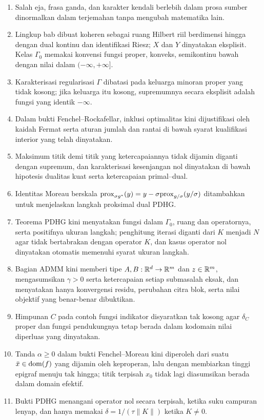 \documentclass[indonesian]{shinybook}
\begin{document}
\begin{enumerate}
    \item Salah eja, frasa ganda, dan karakter kendali berlebih dalam prosa sumber dinormalkan dalam terjemahan tanpa mengubah matematika lain.
    \item Lingkup bab dibuat koheren sebagai ruang Hilbert riil berdimensi hingga dengan dual kontinu dan identifikasi Riesz; $X$ dan $Y$ dinyatakan eksplisit. Kelas $\Gamma_0$ memakai konvensi fungsi proper, konveks, semikontinu bawah dengan nilai dalam $(-\infty,+\infty]$.
    \item Karakterisasi regularisasi $\Gamma$ dibatasi pada keluarga minoran proper yang tidak kosong; jika keluarga itu kosong, supremumnya secara eksplisit adalah fungsi yang identik $-\infty$.
    \item Dalam bukti Fenchel--Rockafellar, inklusi optimalitas kini dijustifikasi oleh kaidah Fermat serta aturan jumlah dan rantai di bawah syarat kualifikasi interior yang telah dinyatakan.
    \item Maksimum titik demi titik yang ketercapaiannya tidak dijamin diganti dengan supremum, dan karakterisasi kesenjangan nol dinyatakan di bawah hipotesis dualitas kuat serta ketercapaian primal--dual.
    \item Identitas Moreau berskala $\mathrm{prox}_{\sigma g^*}(y)=y-\sigma\mathrm{prox}_{g/\sigma}(y/\sigma)$ ditambahkan untuk menjelaskan langkah proksimal dual PDHG.
    \item Teorema PDHG kini menyatakan fungsi dalam $\Gamma_0$, ruang dan operatornya, serta positifnya ukuran langkah; penghitung iterasi diganti dari $K$ menjadi $N$ agar tidak bertabrakan dengan operator $K$, dan kasus operator nol dinyatakan otomatis memenuhi syarat ukuran langkah.
    \item Bagian ADMM kini memberi tipe $A,B:\mathbb{R}^d\to\mathbb{R}^m$ dan $z\in\mathbb{R}^m$, mengasumsikan $\gamma>0$ serta ketercapaian setiap submasalah eksak, dan menyatakan hanya konvergensi residu, perubahan citra blok, serta nilai objektif yang benar-benar dibuktikan.
    \item Himpunan $C$ pada contoh fungsi indikator disyaratkan tak kosong agar $\delta_C$ proper dan fungsi pendukungnya tetap berada dalam kodomain nilai diperluas yang dinyatakan.
    \item Tanda $\alpha\geq0$ dalam bukti Fenchel--Moreau kini diperoleh dari suatu $\bar x\in\operatorname{\mathrm{dom}}(f)$ yang dijamin oleh keproperan, lalu dengan membiarkan tinggi epigraf menuju tak hingga; titik terpisah $x_0$ tidak lagi diasumsikan berada dalam domain efektif.
    \item Bukti PDHG menangani operator nol secara terpisah, ketika suku campuran lenyap, dan hanya memakai $\delta=1/(\tau\|K\|)$ ketika $K\neq0$.

\end{enumerate}
\end{document}
